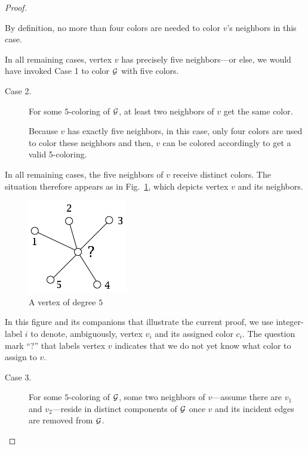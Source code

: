 \begin{proof}
\begin{description}
\smallskip

By definition, no more than four colors are needed to color $v$'s neighbors in this case.
\end{description}

In all remaining cases, vertex $v$ has precisely five neighbors---or else, we would have invoked Case 1 to color $\mbox{$\cal G$}$ with five colors.  


\begin{description}
\item[{\sf Case 2}.]
For some $5$-coloring of $\mbox{$\cal G$}$, at least two neighbors of $v$ get the same color.

\smallskip

Because $v$ has exactly five neighbors, in this case, only four colors are used to color these neighbors
and then, $v$ can be colored accordingly to get a valid 5-coloring.
\end{description}
In all remaining cases, the five neighbors of $v$ receive distinct colors.  The situation therefore appears as in Fig.~\ref{fig:5colorsInit}, which depicts vertex $v$ and its neighbors.
\begin{figure}[hbt]
\begin{center}
   \includegraphics[scale=0.45]{FiguresGraph/5colorsInit}
\caption{A vertex of degree $5$}
  \label{fig:5colorsInit}
\end{center}
\end{figure}
In this figure and its companions that illustrate the current proof, we use integer-label $i$ to denote, ambiguously, vertex $v_i$ and its assigned color $c_i$.  The question mark ``?'' that labels vertex $v$ indicates that we do not yet know what color to assign to $v$. 


\begin{description}
\item[{\sf Case 3}.]
For some $5$-coloring of $\mbox{$\cal G$}$, some two neighbors of $v$---assume there are $v_1$ and $v_2$---reside in distinct components of $\mbox{$\cal G$}$ once $v$ and its incident edges are removed from $\mbox{$\cal G$}$.


\end{description}
\end{proof}
